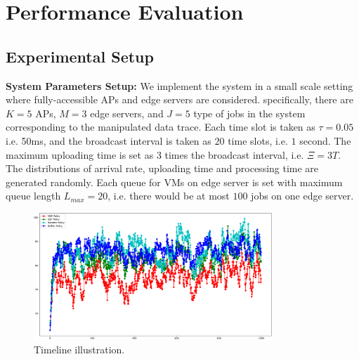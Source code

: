 \section{Performance Evaluation}
\label{sec:evaluation}

\subsection{Experimental Setup}
\textbf{System Parameters Setup:}
We implement the system in a small scale setting where fully-accessible APs and edge servers are considered.
specifically, there are $K=5$ APs, $M=3$ edge servers, and $J=5$ type of jobs in the system corresponding to the manipulated data trace.
Each time slot is taken as $\tau = 0.05$ i.e. 50ms, and the broadcast interval is taken as $20$ time slots, i.e. $1$ second.
The maximum uploading time is set as $3$ times the broadcast interval, i.e. $\Xi = 3T$.
The distributions of arrival rate, uploading time and processing time are generated randomly.
Each queue for VMs on edge server is set with maximum queue length $L_{max}=20$, i.e. there would be at most $100$ jobs on one edge server.

\begin{figure}[ht!]
    \centering
    \includegraphics[width=0.80\textwidth]{images/Figure_1.pdf}
    \caption{Timeline illustration.}
    \label{fig:general_timeline}
\end{figure}

